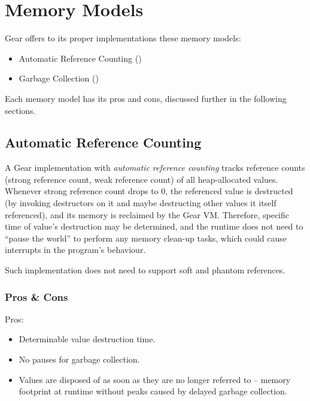 
\chapter{Memory Models}
\label{sec:memory-models}

Gear offers to its proper implementations these memory models:
\begin{itemize}
  \item Automatic Reference Counting ()
  \item Garbage Collection ()
\end{itemize}

Each memory model has its pros and cons, discussed further in the following sections. 






\section{Automatic Reference Counting}
\label{sec:arc-memory-model}

A Gear implementation with {\em automatic reference counting} tracks reference counts (strong reference count, weak reference count) of all heap-allocated values. Whenever strong reference count drops to 0, the referenced value is destructed (by invoking destructors on it and maybe destructing other values it itself referenced), and its memory is reclaimed by the Gear VM. Therefore, specific time of value's destruction may be determined, and the runtime does not need to ``pause the world'' to perform any memory clean-up tasks, which could cause interrupts in the program's behaviour. 

Such implementation does not need to support soft and phantom references. 






\subsection{Pros \& Cons}

Pros:
\begin{itemize}
  \item Determinable value destruction time.
  \item No pauses for garbage collection. 
  \item Values are disposed of as soon as they are no longer referred to -- memory footprint at runtime without peaks caused by delayed garbage collection. 
\end{itemize}

